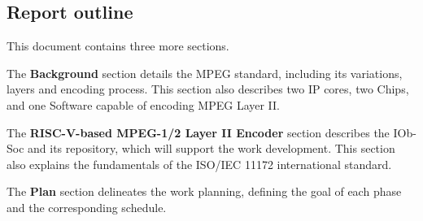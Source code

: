 
\subsection{Report outline}

This document contains three more sections.

The \textbf{Background} section details the MPEG standard, including its variations, layers and encoding process. This section also describes two IP cores, two Chips, and one Software capable of encoding MPEG Layer II.

The \textbf{RISC-V-based MPEG-1/2 Layer II Encoder} section describes the IOb-Soc and its repository, which will support the work development. This section also explains the fundamentals of the ISO/IEC 11172 international standard.

The \textbf{Plan} section delineates the work planning, defining the goal of each phase and the corresponding schedule.